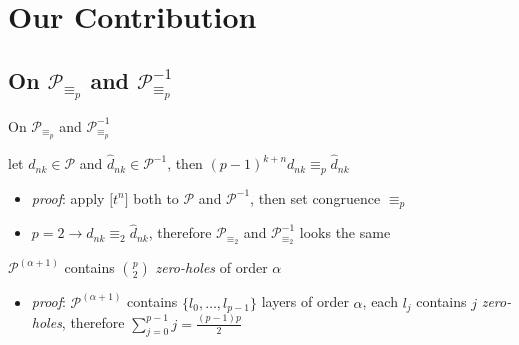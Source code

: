 \documentclass[10pt,serif, professionalfont]{beamer}
\begin{document}
\section{Our Contribution}

\subsection{On $\mathcal{P}_{\equiv_{p}}$ and $\mathcal{P}_{\equiv_{p}}^{-1}$}

\begin{frame}{On $\mathcal{P}_{\equiv_{p}}$ and $\mathcal{P}_{\equiv_{p}}^{-1}$}
    \begin{theorem}
        let $d_{nk}\in\mathcal{P}$ and  $\hat{d}_{nk}\in\mathcal{P}^{-1}$, then
            $(p-1)^{k+n}d_{nk}\equiv_{p} \hat{d}_{nk}$
    \end{theorem}
    \begin{itemize}
        \item \emph{proof}: apply $\big[t^{n}\big]$ both to $\mathcal{P}$ and $\mathcal{P}^{-1}$,
            then set congruence $\equiv_{p}$ 
        \item $p=2 \rightarrow d_{nk}\equiv_{2}\hat{d}_{nk}$, therefore $\mathcal{P}_{\equiv_{2}}$ and 
            $\mathcal{P}_{\equiv_{2}}^{-1}$ looks the same
    \end{itemize}
    \pause
    \begin{theorem}
         $\mathcal{P}^{(\alpha+1)}$ contains 
        ${{p}\choose{2}}$ \emph{zero-holes} of order $\alpha$
    \end{theorem}
    \begin{itemize}
        \item \emph{proof}: $\mathcal{P}^{(\alpha+1)}$ contains $\lbrace l_{0},\ldots,l_{p-1}\rbrace$ 
            layers of order $\alpha$, each $l_{j}$ contains $j$ \emph{zero-holes}, therefore
            $\sum_{j=0}^{p-1}{j}=\frac{(p-1)p}{2}$
    \end{itemize}
\end{frame}
\end{document}
